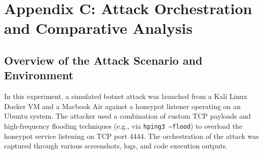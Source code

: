 \documentclass{article}
\begin{document}



\newpage \section*{Appendix C: Attack Orchestration and Comparative Analysis}

\subsection*{Overview of the Attack Scenario and Environment}
\noindent
In this experiment, a simulated botnet attack was launched from a Kali Linux Docker VM and a Macbook Air against a honeypot listener operating on an Ubuntu system. The attacker used a combination of custom TCP payloads and high-frequency flooding techniques (e.g., via \texttt{hping3 --flood}) to overload the honeypot service listening on TCP port 4444. The orchestration of the attack was captured through various screenshots, logs, and code execution outputs.
\end{document}
